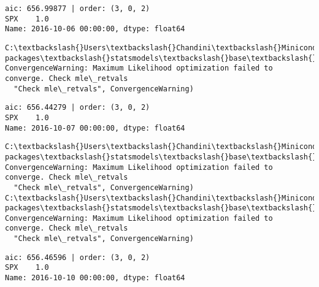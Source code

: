 \documentclass[11pt]{article}
\begin{document}
    \begin{Verbatim}[commandchars=\\\{\}]
aic: 656.99877 | order: (3, 0, 2)
SPX    1.0
Name: 2016-10-06 00:00:00, dtype: float64

    \end{Verbatim}

    \begin{Verbatim}[commandchars=\\\{\}]
C:\textbackslash{}Users\textbackslash{}Chandini\textbackslash{}Miniconda3\textbackslash{}envs\textbackslash{}auquan\textbackslash{}lib\textbackslash{}site-packages\textbackslash{}statsmodels\textbackslash{}base\textbackslash{}model.py:496: ConvergenceWarning: Maximum Likelihood optimization failed to converge. Check mle\_retvals
  "Check mle\_retvals", ConvergenceWarning)

    \end{Verbatim}

    \begin{Verbatim}[commandchars=\\\{\}]
aic: 656.44279 | order: (3, 0, 2)
SPX    1.0
Name: 2016-10-07 00:00:00, dtype: float64

    \end{Verbatim}

    \begin{Verbatim}[commandchars=\\\{\}]
C:\textbackslash{}Users\textbackslash{}Chandini\textbackslash{}Miniconda3\textbackslash{}envs\textbackslash{}auquan\textbackslash{}lib\textbackslash{}site-packages\textbackslash{}statsmodels\textbackslash{}base\textbackslash{}model.py:496: ConvergenceWarning: Maximum Likelihood optimization failed to converge. Check mle\_retvals
  "Check mle\_retvals", ConvergenceWarning)
C:\textbackslash{}Users\textbackslash{}Chandini\textbackslash{}Miniconda3\textbackslash{}envs\textbackslash{}auquan\textbackslash{}lib\textbackslash{}site-packages\textbackslash{}statsmodels\textbackslash{}base\textbackslash{}model.py:496: ConvergenceWarning: Maximum Likelihood optimization failed to converge. Check mle\_retvals
  "Check mle\_retvals", ConvergenceWarning)

    \end{Verbatim}

    \begin{Verbatim}[commandchars=\\\{\}]
aic: 656.46596 | order: (3, 0, 2)
SPX    1.0
Name: 2016-10-10 00:00:00, dtype: float64

    \end{Verbatim}
\end{document}
